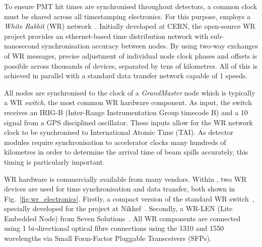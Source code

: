 To ensure PMT hit times are synchronised throughout \chips detectors, a common clock must be
shared across all timestamping electronics. For this purpose, \chips employs a \emph{White Rabbit}
(WR) network~\cite{lipinski2011}. Initially developed at CERN, the open-source WR project provides
an ethernet-based time distribution network with sub-nanosecond synchronisation accuracy between
nodes. By using two-way exchanges of WR messages, precise adjustment of individual node clock
phases and offsets is possible across thousands of devices, separated by tens of kilometres. All
of this is achieved in parallel with a standard data transfer network capable of
\unit{1}{} speeds.

All nodes are synchronised to the clock of a \emph{GrandMaster} node which is typically a WR
\emph{switch}, the most common WR hardware component. As input, the switch receives an IRIG-B
(Inter-Range Instrumentation Group timecode B) and a \unit{10}{} signal from a GPS
disciplined oscillator. These inputs allow for the WR network clock to be synchronised to
International Atomic Time (TAI). As \chips detector modules require synchronisation to accelerator
clocks many hundreds of kilometres in order to determine the arrival time of beam spills
accurately, this timing is particularly important.

WR hardware is commercially available from many vendors. Within \chipsfive, two WR devices are
used for time synchronisation and data transfer, both shown in Fig.~\ref{fig:wr_electronics}.
Firstly, a compact version of the standard WR switch~\cite{wrswitch2020}, specially developed for
the \chips project at Nikhef~\cite{wrchromium2020}. Secondly, a WR-LEN (Lite Embedded Node) from
Seven Solutions~\cite{wrlen2020}. All WR components are connected using \unit{1}{}
bi-directional optical fibre connections using the \unit{1310}{} and
\unit{1550}{} wavelengths via Small Form-Factor Pluggable Transceivers (SFPs).

